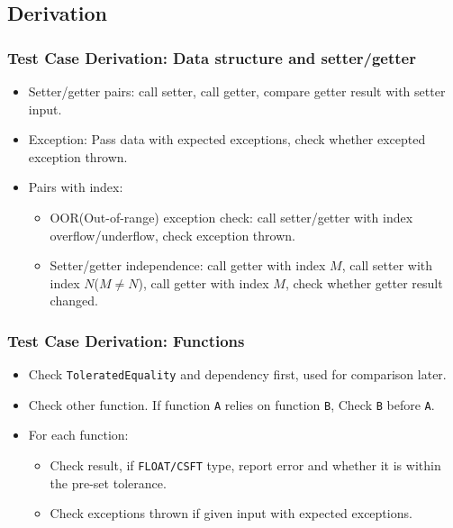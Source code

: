 \documentclass[12pt]{beamer}
\newcommand{\li}[1]{\texttt{#1}}
\begin{document}
	\subsection{Derivation}
	\begin{frame}
		\frametitle{Test Case Derivation: Data structure and setter/getter}
		\begin{itemize}
			\item Setter/getter pairs: call setter, call getter, compare getter result with setter input.
			\item Exception: Pass data with expected exceptions, check whether excepted exception thrown.
			\item Pairs with index:
			\begin{itemize}
				\item OOR(Out-of-range) exception check: call setter/getter with index overflow/underflow, check exception thrown.
				\item Setter/getter independence: call getter with index $M$, call setter with index $N$($M\neq N$), call getter with index $M$, check whether getter result changed.
			\end{itemize}
		\end{itemize}
	\end{frame}
	\begin{frame}
		\frametitle{Test Case Derivation: Functions}
		\begin{itemize}
			\item Check \li{ToleratedEquality} and dependency first, used for comparison later.
			\item Check other function. If function \li{A} relies on function \li{B}, Check \li{B} before \li{A}.
			\item For each function:
			\begin{itemize}
				\item Check result, if \li{FLOAT/CSFT} type, report error and whether it is within the pre-set tolerance.
				\item Check exceptions thrown if given input with expected exceptions.
			\end{itemize}
		\end{itemize}
	\end{frame}
\end{document}
